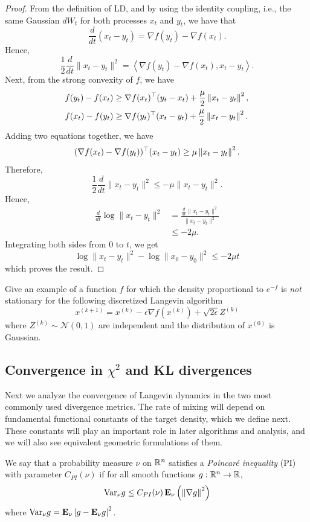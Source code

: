 \begin{proof}
From the definition of LD, and by using the identity coupling, i.e.,
the same Gaussian $dW_{t}$ for both processes $x_{t}$ and $y_{t}$,
we have that 
\[
\frac{d}{dt}\left(x_{t}-y_{t}\right)=\nabla f(y_{t})-\nabla f(x_{t}).
\]
Hence, 
\[
\frac{1}{2}\frac{d}{dt}\|x_{t}-y_{t}\|^{2}=\left\langle \nabla f(y_{t})-\nabla f(x_{t}),x_{t}-y_{t}\right\rangle .
\]
Next, from the strong convexity of $f$, we have 
\begin{align*}
f(y_{t})-f(x_{t}) & \ge\nabla f(x_{t})^{\top}(y_{t}-x_{t})+\frac{\mu}{2}\left\Vert x_{t}-y_{t}\right\Vert^{2},\\
f(x_{t})-f(y_{t}) & \ge\nabla f(y_{t})^{\top}(x_{t}-y_{t})+\frac{\mu}{2}\left\Vert x_{t}-y_{t}\right\Vert^{2}.
\end{align*}
Adding two equations together, we have
\[
(\nabla f(x_{t})-\nabla f(y_{t}))^{\top}(x_{t}-y_{t})\geq\mu\left\Vert x_{t}-y_{t}\right\Vert^{2}.
\]
Therefore, 
\[
\frac{1}{2}\frac{d}{dt}\|x_{t}-y_{t}\|^{2}\leq-\mu\|x_{t}-y_{t}\|^{2}.
\]
 Hence, 
\begin{align*}
\frac{d}{dt}\log\|x_{t}-y_{t}\|^{2} & =\frac{\frac{d}{dt}\|x_{t}-y_{t}\|^{2}}{\|x_{t}-y_{t}\|^{2}}\\
 & \leq-2\mu.
\end{align*}
Integrating both sides from $0$ to $t$, we get 
\[
\log\|x_{t}-y_{t}\|^{2}-\log\|x_{0}-y_{0}\|^{2}\le-2\mu t
\]
which proves the result.
\end{proof}
\begin{xca}
Give an example of a function $f$ for which the density proportional
to $e^{-f}$ is \emph{not} stationary for the following discretized
Langevin algorithm 
\[
x^{(k+1)}=x^{(k)}-\epsilon\nabla f(x^{(k)})+\sqrt{2\epsilon}Z^{(k)}
\]
where $Z^{(k)}\sim\mathcal{N}(0,1)$ are independent and the distribution
of $x^{(0)}$ is Gaussian.
\end{xca}


\subsection{Convergence in $\chi^{2}$ and KL divergences}

Next we analyze the convergence of Langevin dynamics in the two most
commonly used divergence metrics. The rate of mixing will depend on
fundamental functional constants of the target density, which we define
next. These constants will play an important role in later algorithms
and analysis, and we will also see equivalent geometric formulations
of them.
\begin{defn}
We say that a probability measure $\nu$ on $\mathbb{R}^{n}$ satisfies a
\emph{Poincar\'e inequality} (PI) with parameter $C_{PI}(\nu)$ if
for all smooth functions $g:\mathbb{R}^{n}\to\mathbb{R}$,
\begin{equation}
\mathrm{Var}_{\nu}g\leq C_{PI}(\nu)\,\mathbf{E}_{\nu}\left(\left\Vert \nabla g\right\Vert^{2}\right)\label{eq:pi}
\end{equation}
where $\mathrm{Var}_{\nu}g=\mathbf{E}_{\nu}\left\vert g-\mathbf{E}_{\nu}g\right\vert^{2}$.
\end{defn}

